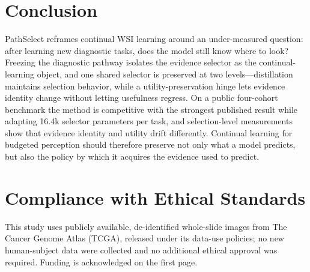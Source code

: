 \documentclass{article}
\begin{document}
\section{Conclusion}

PathSelect reframes continual WSI learning around an under-measured question: after learning new diagnostic tasks, does the model still know where to look? Freezing the diagnostic pathway isolates the evidence selector as the continual-learning object, and one shared selector is preserved at two levels---distillation maintains selection behavior, while a utility-preservation hinge lets evidence identity change without letting usefulness regress. On a public four-cohort benchmark the method is competitive with the strongest published result while adapting 16.4k selector parameters per task, and selection-level measurements show that evidence identity and utility drift differently. Continual learning for budgeted perception should therefore preserve not only what a model predicts, but also the policy by which it acquires the evidence used to predict.




\section*{Compliance with Ethical Standards}
This study uses publicly available, de-identified whole-slide images from The Cancer Genome Atlas (TCGA), released under its data-use policies; no new human-subject data were collected and no additional ethical approval was required. Funding is acknowledged on the first page.
\end{document}
